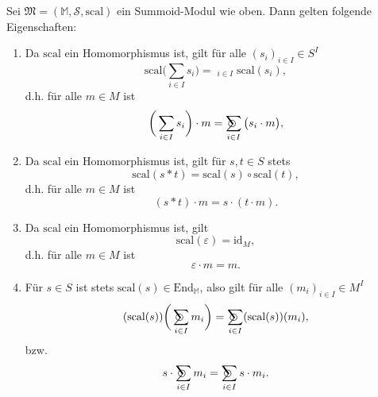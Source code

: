 \documentclass{article}
\DeclareMathOperator*{\sumcirc}{%
  \ThisStyle{\mathop{\ensurestackMath{\stackinset{c}{-1.5\LMpt}{c}{}{%
  \rotatebox[origin=lb]{-90}{$\SavedStyle\scalerel*{\bm\Circle}{%
  i}$}}{\SavedStyle\sum}}}}}
\DeclareMathOperator*{\sumbar}{\overline{\sum}}
\begin{document}
\begin{remark}
  Sei $\mathfrak{M} = (\mathbb{M}, \mathcal{S}, \text{scal})$ ein Summoid-Modul wie oben.
  Dann gelten folgende Eigenschaften:
  \begin{enumerate}
    \item Da $\text{scal}$ ein Homomorphismus ist, gilt für alle $(s_i)_{i \in I} \in S^I$
          \begin{equation*}
            \text{scal}\bigg(\sum_{i \in I}s_i\bigg) = \sumbar_{i \in I} \text{scal}(s_i),
          \end{equation*}
          d.h. für alle $m \in M$ ist
          \begin{equation*}
            \bigg(\sum_{i \in I}s_i\bigg) \cdot m = \sumcirc_{i \in I} \big(s_i \cdot m\big),
          \end{equation*}
    \item Da $\text{scal}$ ein Homomorphismus ist, gilt für $s, t \in S$ stets
          \begin{equation*}
            \text{scal}(s \ast t) = \text{scal}(s) \circ \text{scal}(t),
          \end{equation*}
          d.h. für alle $m \in M$ ist
          \begin{equation*}
            (s \ast t) \cdot m = s \cdot (t \cdot m).
          \end{equation*}
    \item Da $\text{scal}$ ein Homomorphismus ist, gilt
          \begin{equation*}
            \text{scal}(\varepsilon) = \text{id}_M,
          \end{equation*}
          d.h. für alle $m \in M$ ist
          \begin{equation*}
            \varepsilon \cdot m = m.
          \end{equation*}
    \item Für $s \in S$ ist stets $\text{scal}(s) \in \text{End}_\mathbb{M}$,
          also gilt für alle $(m_i)_{i \in I} \in M^I$
          \begin{equation*}
            (\text{scal}(s))\bigg(\sumcirc_{i \in I} m_i\bigg) = \sumcirc_{i \in I}(\text{scal}(s))(m_i),
          \end{equation*}
          bzw.
          \begin{equation*}
            s \cdot \sumcirc_{i \in I}m_i = \sumcirc_{i \in I}s \cdot m_i.
          \end{equation*}
  \end{enumerate}
\end{remark}
\end{document}
